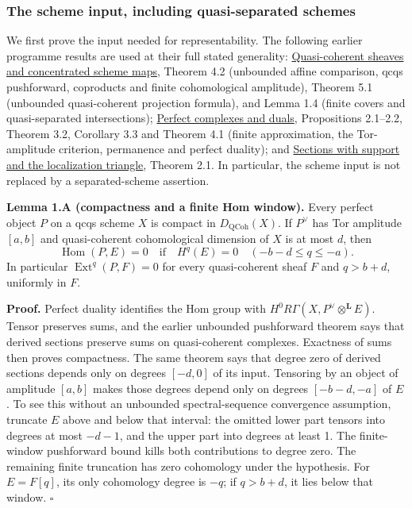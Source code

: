 \documentclass[11pt]{article}
\begin{document}
\subsubsection{The scheme input, including quasi-separated
schemes}\label{the-scheme-input-including-quasi-separated-schemes}

We first prove the input needed for representability. The following
earlier programme results are used at their full stated generality:
\href{../derived-categories-and-sheaf-operations/quasi-coherent-sheaves-and-concentrated-maps.html}{Quasi-coherent
sheaves and concentrated scheme maps}, Theorem 4.2 (unbounded affine
comparison, qcqs pushforward, coproducts and finite cohomological
amplitude), Theorem 5.1 (unbounded quasi-coherent projection formula),
and Lemma 1.4 (finite covers and quasi-separated intersections);
\href{../derived-categories-and-sheaf-operations/perfect-complexes-and-duals.html}{Perfect
complexes and duals}, Propositions 2.1--2.2, Theorem 3.2, Corollary 3.3
and Theorem 4.1 (finite approximation, the Tor-amplitude criterion,
permanence and perfect duality); and
\href{../derived-categories-and-sheaf-operations/sections-with-support-and-the-localization-triangle.html}{Sections
with support and the localization triangle}, Theorem 2.1. In particular,
the scheme input is not replaced by a separated-scheme assertion.

\textbf{Lemma 1.A (compactness and a finite Hom window).} Every perfect
object \(P\) on a qcqs scheme \(X\) is compact in
\(D_{\mathrm{QCoh}}(X)\). If \(P^\vee\) has Tor amplitude \([a,b]\) and
quasi-coherent cohomological dimension of \(X\) is at most \(d\), then
\[
\operatorname{Hom}(P,E)=0
\quad\text{if}\quad H^q(E)=0\quad(-b-d\leq q\leq-a).
\tag{1.A}
\] In particular \(\operatorname{Ext}^q(P,F)=0\) for every
quasi-coherent sheaf \(F\) and \(q>b+d\), uniformly in \(F\).

\textbf{Proof.} Perfect duality identifies the Hom group with
\(H^0R\Gamma(X,P^\vee\otimes^{\mathbf L}E)\). Tensor preserves sums, and
the earlier unbounded pushforward theorem says that derived sections
preserve sums on quasi-coherent complexes. Exactness of sums then proves
compactness. The same theorem says that degree zero of derived sections
depends only on degrees \([-d,0]\) of its input. Tensoring by an object
of amplitude \([a,b]\) makes those degrees depend only on degrees
\([-b-d,-a]\) of \(E\). To see this without an unbounded
spectral-sequence convergence assumption, truncate \(E\) above and below
that interval: the omitted lower part tensors into degrees at most
\(-d-1\), and the upper part into degrees at least 1. The finite-window
pushforward bound kills both contributions to degree zero. The remaining
finite truncation has zero cohomology under the hypothesis. For
\(E=F[q]\), its only cohomology degree is \(-q\); if \(q>b+d\), it lies
below that window. \(\square\)
\end{document}
